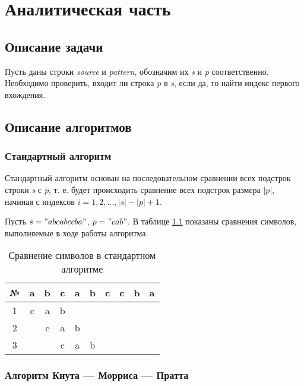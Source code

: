 \chapter{Аналитическая часть}

\section{Описание задачи}

Пусть даны строки \textit{source} и \textit{pattern}, обозначим их \textit{s} и \textit{p} соответственно.
Необходимо проверить, входит ли строка \textit{p} в \textit{s}, если да, то найти индекс первого вхождения.

\section{Описание алгоритмов}

\subsection{Стандартный алгоритм}

Стандартный алгоритм основан на последовательном сравнении всех подстрок строки \textit{s} с \textit{p}, т. е. будет происходить сравнение всех подстрок размера $|p|$, начиная с индексов $i = 1,2,...,|s|-|p|+1$.

Пусть $s= "abcabccba"$, $p = "cab"$.
В таблице \ref{tbl:standard-analysis} показаны сравнения символов, выполняемые в ходе работы алгоритма.

\begin{table}[h]
	\begin{center}
		\begin{tabular}{|c|c|c|c|c|c|c|c|c|c|}
			\hline
			№&a&b&c&a&b&c&c&b&a\\
			\hline
			1&c&a&b& & & & & &\\
			\hline
			2& &c&a&b& & & & &\\
			\hline
			3& & &c&a&b& & & &\\
			\hline
		\end{tabular}
	\end{center}
	\caption{Сравнение символов в стандартном алгоритме}
	\label{tbl:standard-analysis}
\end{table}

\subsection{Алгоритм Кнута — Морриса — Пратта}

